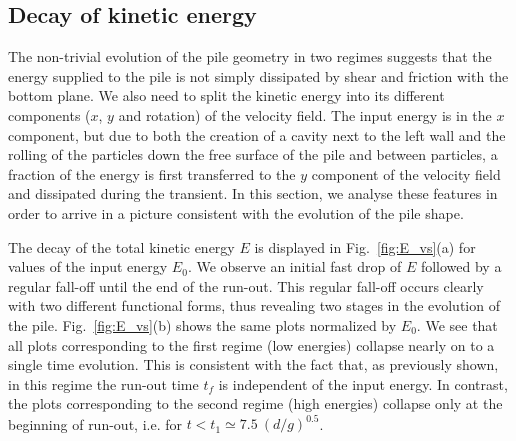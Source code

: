 \subsection{Decay of kinetic energy}
\label{sec:decay}

The non-trivial evolution of the pile geometry  in two regimes suggests that 
the energy supplied to the pile is not simply dissipated by shear and friction 
with the bottom plane. We also need to split the kinetic energy into its 
different components ($x$, $y$ and rotation) of the velocity field. The input 
energy is in the $x$ component, but due to both the creation of a cavity next 
to the left wall and the rolling of the particles down the free surface of the 
pile and between particles, a fraction of the energy is first transferred to 
the $y$ component of the velocity field and dissipated  during the transient. 
In this section, we analyse these features  in order to arrive in a picture 
consistent with the evolution of the pile shape.  

The decay of the total kinetic energy $E$ is displayed in 
Fig.~\cref{fig:E_vs}(a) for values of the input energy $E_0$. We observe an 
initial fast drop of $E$ followed by a regular fall-off until the end of the 
run-out. This regular fall-off occurs clearly with two different functional 
forms, thus revealing two stages in the evolution of the pile. 
Fig.~\cref{fig:E_vs}(b) shows the same plots normalized by $E_0$. We see that 
all plots corresponding to the first regime (low energies) collapse nearly on 
to a single time evolution. 
This is consistent with the fact that, as previously shown, in this 
regime the run-out time $t_f$ is independent of the input energy. In contrast, 
the plots corresponding to the second regime (high energies) collapse only at 
the beginning of run-out, i.e. for $t < t_1 \simeq 7.5 \ (d/g)^{0.5}$.   


